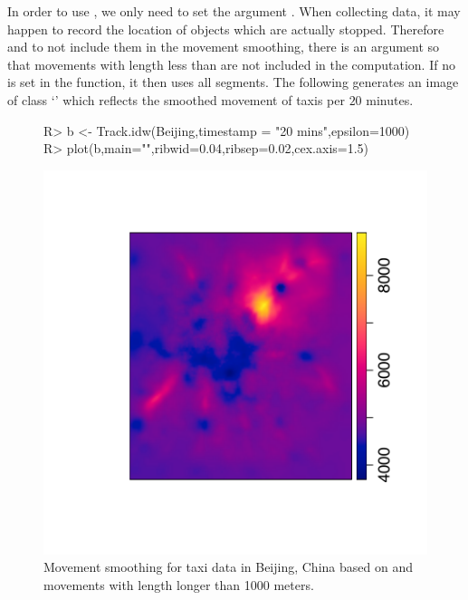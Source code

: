 \documentclass[article]{jss}
\newcommand{\class}[1]{`\code{#1}'}
\begin{document}
  In order to use , we only need to set the argument . When collecting data, it may happen to record the location of objects which are actually stopped. Therefore and to not include them in the movement smoothing, there is an argument  so that movements with length less than  are not included in the computation. If no  is set in the function, it then uses all segments. 
  The following  generates an image of class \class{im} which reflects the smoothed movement of taxis per $20$ minutes.
\begin{figure}[!h]
\begin{center}
\begin{Sinput}
R> b <- Track.idw(Beijing,timestamp = "20 mins",epsilon=1000)
R> plot(b,main="",ribwid=0.04,ribsep=0.02,cex.axis=1.5)
\end{Sinput}
\includegraphics{article-017}
\end{center}
\caption{Movement smoothing for taxi data in Beijing, China based on  and movements with length longer than 1000 meters.}
\label{idwBeijing}
\end{figure}
\end{document}
